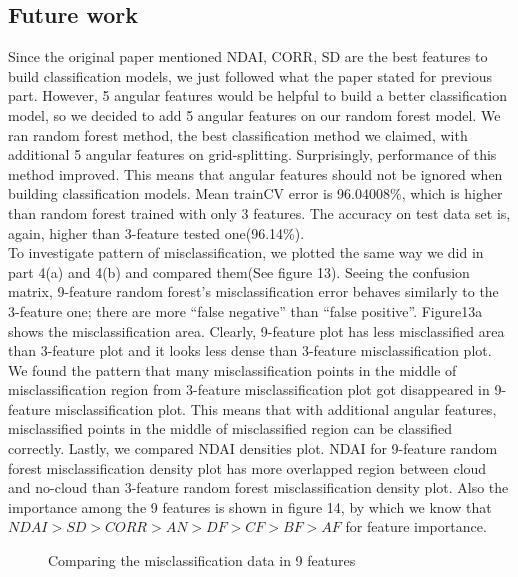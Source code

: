 \documentclass[12pt]{extarticle}
\begin{document}
\subsection{Future work}
Since the original paper mentioned NDAI, CORR, SD are the best features to build classification models, we just followed what the paper stated for previous part. However, 5 angular features would be helpful to build a better classification model, so we decided to add 5 angular features on our random forest model. We ran random forest method, the best classification method we claimed, with additional 5 angular features on grid-splitting. Surprisingly, performance of this method improved. This means that angular features should not be ignored when building classification models. Mean trainCV error is 96.04008\%, which is higher than random forest trained with only 3 features. The accuracy on test data set is, again, higher than 3-feature tested one(96.14\%). 
\\To investigate pattern of misclassification, we plotted the same way we did in part 4(a) and 4(b) and compared them(See figure 13). Seeing the confusion matrix, 9-feature random forest’s misclassification error behaves similarly to the 3-feature one; there are more “false negative” than “false positive”. Figure13a shows the misclassification area. Clearly, 9-feature plot has less misclassified area than 3-feature plot and it looks less dense than 3-feature misclassification plot. We found the pattern that many misclassification points in the middle of misclassification region from 3-feature misclassification plot got disappeared in 9-feature misclassification plot. This means that with additional angular features, misclassified points in the middle of misclassified region can be classified correctly. Lastly, we compared NDAI densities plot. NDAI for 9-feature random forest misclassification density plot has more overlapped region between cloud and no-cloud than 3-feature random forest misclassification density plot. Also the  importance among the 9 features is shown in figure 14, by which we know that $NDAI > SD > CORR > AN> DF> CF> BF >AF$ for feature importance.

\begin{figure}[htb]
\centering
{}
\quad
{}
\caption{Comparing the misclassification data in 9 features}\label{fig 1}
\end{figure}
\end{document}

